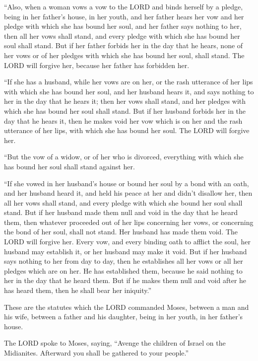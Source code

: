 \myverse{}“Also, when a woman vows a vow to the LORD and binds herself by
a pledge, being in her father’s house, in her youth,
\myverse{}and her father hears her vow and her pledge with which she has bound her soul,
and her father says nothing to her, then all her vows shall stand, and every pledge with which she has
bound her soul shall stand.
\myverse{}But if her father forbids her in the day that he hears, none of her vows or
of her pledges with which she has bound her soul, shall stand. The LORD will forgive her, because her
father has forbidden her.


\myverse{}“If she has a husband, while her vows are on her, or the rash
utterance of her lips with which she has bound her soul,
\myverse{}and her husband hears it, and says nothing to her in the day that he hears
it; then her vows shall stand, and her pledges with which she has bound her soul shall stand.
\myverse{}But if her husband forbids her in the day that he hears it, then he makes void
her vow which is on her and the rash utterance of her lips, with which she has bound her soul. The LORD
will forgive her.


\myverse{}“But the vow of a widow, or of her who is divorced, everything
with which she has bound her soul shall stand against her.


\myverse{}“If she vowed in her husband’s house or bound her soul by a
bond with an oath,
\myverse{}and her husband heard it, and held his peace at her and didn’t disallow her,
then all her vows shall stand, and every pledge with which she bound her soul shall stand.
\myverse{}But if her husband made them null and void in the day that he heard them,
then whatever proceeded out of her lips concerning her vows, or concerning the bond of her soul, shall
not stand. Her husband has made them void. The LORD will forgive her.
\myverse{}Every vow, and every binding oath to afflict the soul, her husband may establish
it, or her husband may make it void.
\myverse{}But if her husband says nothing to her from day to day, then he establishes
all her vows or all her pledges which are on her. He has established them, because he said nothing to
her in the day that he heard them.
\myverse{}But if he makes them null and void after he has heard them, then he shall
bear her iniquity.”


\myverse{}These are the statutes which the LORD commanded Moses, between
a man and his wife, between a father and his daughter, being in her youth, in her father’s house.


\mychapter{}\myverse*{}The LORD spoke to Moses, saying,
\myverse{}“Avenge the children of Israel on the Midianites. Afterward you shall be gathered
to your people.”


